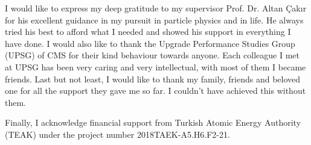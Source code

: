\vspace*{-6pt}
I would like to express my deep gratitude to my supervisor Prof. Dr. Altan Çakır for his excellent guidance in my pursuit in particle physics and in life. He always tried his best to afford what I needed and showed his support in everything I have done. I would also like to thank the Upgrade Performance Studies Group (UPSG) of CMS for their kind behaviour towards anyone. Each colleague I met at UPSG has been very caring and very intellectual, with most of them I became friends. Last but not least, I would like to thank my family, friends and beloved one for all the support they gave me so far. I couldn't have achieved this without them.

Finally, I acknowledge financial support from Turkish Atomic Energy Authority (TEAK) under the project number 2018TAEK-A5.H6.F2-21.